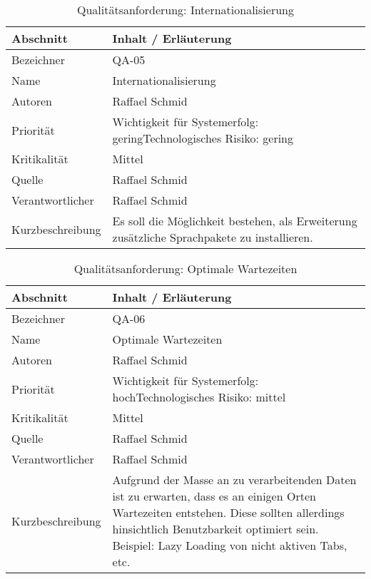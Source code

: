 \begin{longtable}{|p{4cm}|p{10.5cm}|}
    \caption{Qualitätsanforderung: Internationalisierung}\\\hline
   \textbf{Abschnitt} & \textbf{Inhalt / Erläuterung} \\\hline
   Bezeichner & QA-05\\\hline
   Name & Internationalisierung\\\hline
   Autoren & Raffael Schmid\\\hline
   Priorität & Wichtigkeit für Systemerfolg: gering\newline Technologisches Risiko: gering\\\hline
   Kritikalität & Mittel\\\hline
   Quelle & Raffael Schmid\\\hline
   Verantwortlicher & Raffael Schmid\\\hline
   Kurzbeschreibung & Es soll die Möglichkeit bestehen, als Erweiterung zusätzliche Sprachpakete zu installieren.\\\hline
\end{longtable}

\begin{longtable}{|p{4cm}|p{10.5cm}|}
    \caption{Qualitätsanforderung: Optimale Wartezeiten}\\\hline
   \textbf{Abschnitt} & \textbf{Inhalt / Erläuterung} \\\hline
   Bezeichner & QA-06\\\hline
   Name & Optimale Wartezeiten\\\hline
   Autoren & Raffael Schmid\\\hline
   Priorität & Wichtigkeit für Systemerfolg: hoch\newline Technologisches Risiko: mittel\\\hline
   Kritikalität & Mittel\\\hline
   Quelle & Raffael Schmid\\\hline
   Verantwortlicher & Raffael Schmid\\\hline
   Kurzbeschreibung & Aufgrund der Masse an zu verarbeitenden Daten ist zu erwarten, dass es an einigen Orten Wartezeiten entstehen. Diese sollten allerdings hinsichtlich Benutzbarkeit optimiert sein. Beispiel: Lazy Loading von nicht aktiven Tabs, etc.\\\hline
\end{longtable}

